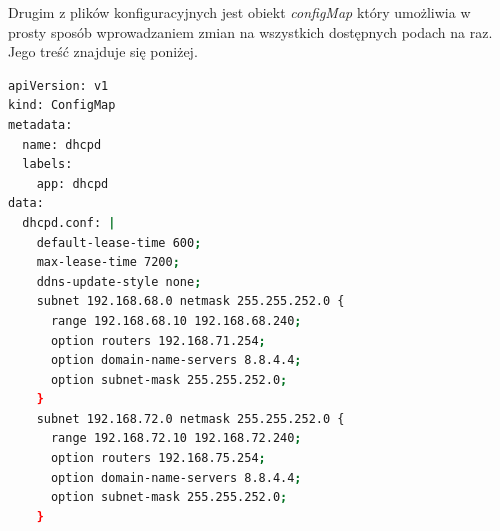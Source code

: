 \documentclass[pl,final,oneside]{mgr} %
\begin{document}
Drugim z plików konfiguracyjnych jest obiekt \textit{configMap} który umożliwia w prosty sposób wprowadzaniem zmian na wszystkich dostępnych podach na raz. Jego treść znajduje się poniżej.

\begin{lstlisting}[language=Bash]
apiVersion: v1
kind: ConfigMap
metadata:
  name: dhcpd
  labels:
    app: dhcpd
data:
  dhcpd.conf: |
    default-lease-time 600;
    max-lease-time 7200;
    ddns-update-style none;
    subnet 192.168.68.0 netmask 255.255.252.0 {
      range 192.168.68.10 192.168.68.240;
      option routers 192.168.71.254;
      option domain-name-servers 8.8.4.4;
      option subnet-mask 255.255.252.0;
    }
    subnet 192.168.72.0 netmask 255.255.252.0 {
      range 192.168.72.10 192.168.72.240;
      option routers 192.168.75.254;
      option domain-name-servers 8.8.4.4;
      option subnet-mask 255.255.252.0;
    }
\end{lstlisting}
\end{document}
